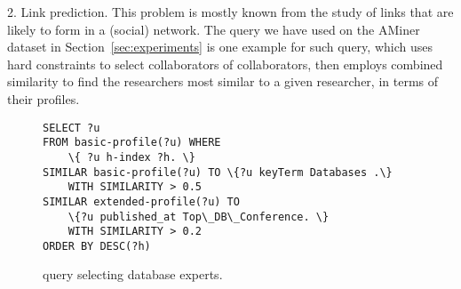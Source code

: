 

\textsf{2. Link prediction.} This problem is mostly known from the study of links that are likely to form in a (social) network. The \qlang{} query we have used on the AMiner dataset in Section~\ref{sec:experiments} is one example for such query, which uses hard constraints to select collaborators of collaborators, then employs combined similarity to find the researchers most similar to a given researcher, in terms of their profiles.

\begin{figure}
	{\scriptsize
\begin{Verbatim}
SELECT ?u
FROM basic-profile(?u) WHERE
	\{ ?u h-index ?h. \}
SIMILAR basic-profile(?u) TO \{?u keyTerm Databases .\}
	WITH SIMILARITY > 0.5
SIMILAR extended-profile(?u) TO
	\{?u published_at Top\_DB\_Conference. \}
	WITH SIMILARITY > 0.2
ORDER BY DESC(?h)
		\end{Verbatim}
	} \vspace{-6mm} \caption{\qlang{} query selecting database experts.} \label{fig:experts}
\end{figure} 

